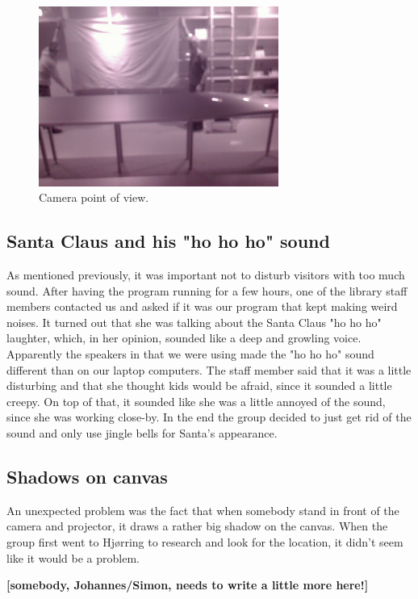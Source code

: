 \begin{figure}[htbp]
\centering
\includegraphics[width=0.70\textwidth]{Pictures/Design/IR_pic}
\caption{Camera point of view.}
\label{fig:camera_POV}
\end{figure}

\subsection{Santa Claus and his "ho ho ho" sound}
As mentioned previously, it was important not to disturb visitors with too much sound. After having the program running for a few hours, one of the library staff members contacted us and asked if it was our program that kept making weird noises. It turned out that she was talking about the Santa Claus "ho ho ho" laughter, which, in her opinion, sounded like a deep and growling voice. Apparently the speakers in that we were using made the "ho ho ho" sound different than on our laptop computers. The staff member said that it was a little disturbing and that she thought kids would be afraid, since it sounded a little creepy. On top of that, it sounded like she was a little annoyed of the sound, since she was working close-by.
In the end the group decided to just get rid of the sound and only use jingle bells for Santa's appearance.

\subsection{Shadows on canvas}
An unexpected problem was the fact that when somebody stand in front of the camera and projector, it draws a rather big shadow on the canvas. When the group first went to Hj{\o}rring to research and look for the location, it didn't seem like it would be a problem.

\textbf{[somebody, Johannes/Simon, needs to write a little more here!]}

